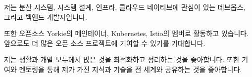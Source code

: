 

\begin{cvparagraph}

저는 분산 시스템, 시스템 설계, 인프라, 클라우드 네이티브에 관심이 있는 데브옵스, 그리고 백엔드 개발자입니다.

또한 오픈소스 Yorkie의 메인테이너, Kubernetes, Istio의 멤버로 활동하고 있습니다. 앞으로도 더 많은 오픈 소스 프로젝트에 기여할 수 있기를 기대합니다.

저는 생활과 개발 모두에서 많은 것을 최적화하고 정리하는 것을 좋아합니다. 또한 기여와 멘토링을 통해 제가 가진 지식과 기술을 전 세계와 공유하는 것을 좋아합니다.
\end{cvparagraph}
